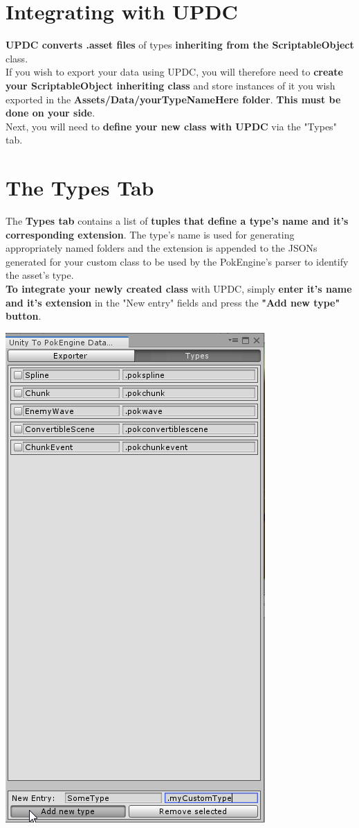 \documentclass[10pt,a4paper]{article}
\begin{document}
\section{Integrating with UPDC}
\textbf{UPDC converts .asset files} of types \textbf{inheriting from the ScriptableObject} class.\\
If you wish to export your data using UPDC, you will therefore need to \textbf{create your ScriptableObject inheriting class} and store instances of it you wish exported in the \textbf{Assets/Data/yourTypeNameHere folder}. \textbf{This must be done on your side}.\\
Next, you will need to \textbf{define your new class with UPDC} via the "Types" tab.

\section{The Types Tab}
The \textbf{Types tab} contains a list of \textbf{tuples that define a type's name and it's corresponding extension}.
The type's name is used for generating appropriately named folders and the extension is appended to the JSONs generated for your custom class to be used by the PokEngine's parser to identify the asset's type.\\
\textbf{To integrate your newly created class} with UPDC, simply \textbf{enter it's name and it's extension} in the "New entry" fields and press the \textbf{"Add new type" button}.
\begin{center}
\includegraphics[scale=0.60]{addingType}
\end{center}
\end{document}
